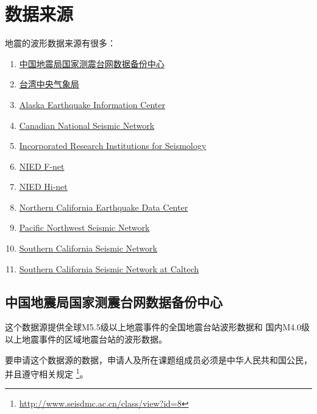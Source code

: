 \section{数据来源}
地震的波形数据来源有很多：
\begin{enumerate}
\item \href{http://www.seisdmc.ac.cn/}{中国地震局国家测震台网数据备份中心}
\item \href{http://e-service.cwb.gov.tw/wdps/}{台湾中央气象局}
\item \href{http://www.aeic.alaska.edu/}{Alaska Earthquake Information Center}
\item \href{http://www.earthquakescanada.nrcan.gc.ca/stndon/CNSN-RNSC/index-eng.php}{Canadian National Seismic Network}
\item \href{http://www.iris.edu/hq/}{Incorporated Research Institutions for Seismology}
\item \href{http://www.fnet.bosai.go.jp/}{NIED F-net}
\item \href{http://www.hinet.bosai.go.jp/}{NIED Hi-net}
\item \href{http://www.ncedc.org/}{Northern California Earthquake Data Center}
\item \href{http://pnsn.org/}{Pacific Northwest Seismic Network}
\item \href{http://www.scsn.org/}{Southern California Seismic Network}
\item \href{http://scedc.caltech.edu/}{Southern California Seismic Network at Caltech}
\end{enumerate}
\subsection{中国地震局国家测震台网数据备份中心}
这个数据源提供全球M5.5级以上地震事件的全国地震台站波形数据和
国内M4.0级以上地震事件的区域地震台站的波形数据。

要申请这个数据源的数据，申请人及所在课题组成员必须是中华人民共和国公民，并且遵守相关规定
\footnote{\url{http://www.seisdmc.ac.cn/class/view?id=8}}。
